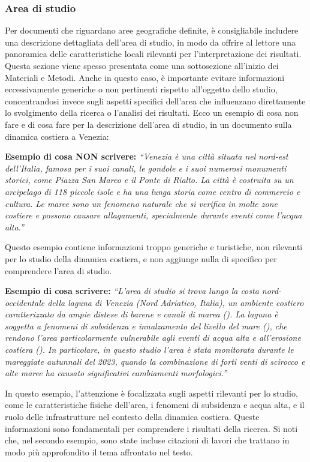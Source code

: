 \documentclass[9pt,a4paper,twoside]{rho-class/rho}
\begin{document}
\subsubsection{Area di studio}
Per documenti che riguardano aree geografiche definite, è consigliabile includere una descrizione dettagliata dell’area di studio, in modo da offrire al lettore una panoramica delle caratteristiche locali rilevanti per l’interpretazione dei risultati. Questa sezione viene spesso presentata come una sottosezione all’inizio dei Materiali e Metodi. Anche in questo caso, è importante evitare informazioni eccessivamente generiche o non pertinenti rispetto all’oggetto dello studio, concentrandosi invece sugli aspetti specifici dell’area che influenzano direttamente lo svolgimento della ricerca o l’analisi dei risultati. Ecco un esempio di cosa non fare e di cosa fare per la descrizione dell’area di studio, in un documento sulla dinamica costiera a Venezia:

\begin{info}
\textbf{Esempio di cosa NON scrivere:}
\textit{“Venezia è una città situata nel nord-est dell’Italia, famosa per i suoi canali, le gondole e i suoi numerosi monumenti storici, come Piazza San Marco e il Ponte di Rialto. La città è costruita su un arcipelago di 118 piccole isole e ha una lunga storia come centro di commercio e cultura. Le maree sono un fenomeno naturale che si verifica in molte zone costiere e possono causare allagamenti, specialmente durante eventi come l’acqua alta.”}

Questo esempio contiene informazioni troppo generiche e turistiche, non rilevanti per lo studio della dinamica costiera, e non aggiunge nulla di specifico per comprendere l’area di studio.

\textbf{Esempio di cosa scrivere:}
\textit{“L’area di studio si trova lungo la costa nord-occidentale della laguna di Venezia (Nord Adriatico, Italia), un ambiente costiero caratterizzato da ampie distese di barene e canali di marea (\cite{ZECCHIN2008185}). La laguna è soggetta a fenomeni di subsidenza e innalzamento del livello del mare (\cite{zanchettin2021sea}), che rendono l’area particolarmente vulnerabile agli eventi di acqua alta e all’erosione costiera (\cite{morucci2020extreme}). In particolare, in questo studio l’area è stata monitorata durante le mareggiate autunnali del 2023, quando la combinazione di forti venti di scirocco e alte maree ha causato significativi cambiamenti morfologici.”}

In questo esempio, l’attenzione è focalizzata sugli aspetti rilevanti per lo studio, come le caratteristiche fisiche dell’area, i fenomeni di subsidenza e acqua alta, e il ruolo delle infrastrutture nel contesto della dinamica costiera. Queste informazioni sono fondamentali per comprendere i risultati della ricerca. Si noti che, nel secondo esempio, sono state incluse citazioni di lavori che trattano in modo più approfondito il tema affrontato nel testo. 
\end{info}
\end{document}

